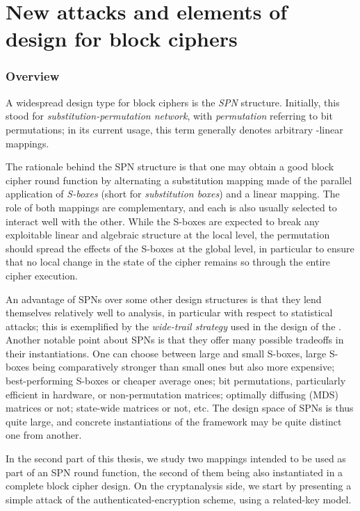 \part[Nouvelles attaques et constructions pour chiffres par bloc]
	{New attacks and elements of design for block ciphers}
\label{part:constructions}

\pagestyle{plain}
\section*{Overview}

A widespread design type for block ciphers is the \emph{SPN} structure. Initially, this stood for \emph{substitution-permutation network},
with \emph{permutation} referring to bit permutations; in its current usage, this term generally denotes arbitrary \ftwo-linear
mappings.

The rationale behind the SPN structure is that one may obtain a good block cipher round function by alternating a substitution
mapping made of the parallel application of \emph{S-boxes} (short for \emph{substitution boxes}) and a linear mapping. The role
of both mappings are complementary, and each is also usually selected to interact well with the other. While the S-boxes
are expected to break any exploitable linear and algebraic structure at the local level, the permutation
should spread the effects of the S-boxes at the global level, in particular to ensure that no local change in the state of the cipher remains so through
the entire cipher execution.

An advantage of SPNs over some other design structures is that they lend themselves relatively well to analysis, in particular with respect to
statistical attacks; this is exemplified by the \emph{wide-trail strategy} used in the design of the \aes. Another notable point
about SPNs is that they offer many possible tradeoffs in their instantiations. One can choose between large and small S-boxes,
large S-boxes being comparatively stronger than small ones but also more expensive; best-performing S-boxes or cheaper
average ones; bit permutations, particularly efficient in hardware, or non-permutation matrices; optimally diffusing (MDS)
matrices or not; state-wide matrices or not, etc. The design space of SPNs is thus quite large, and concrete instantiations
of the framework may be quite distinct one from another. 

\bigskip

In the second part of this thesis, we study two mappings intended to be used as part of an SPN round function, the second
of them being also instantiated in a complete block cipher design. On the cryptanalysis side, we start by presenting a simple attack of the
\proestotr authenticated-encryption scheme, using a related-key model.

